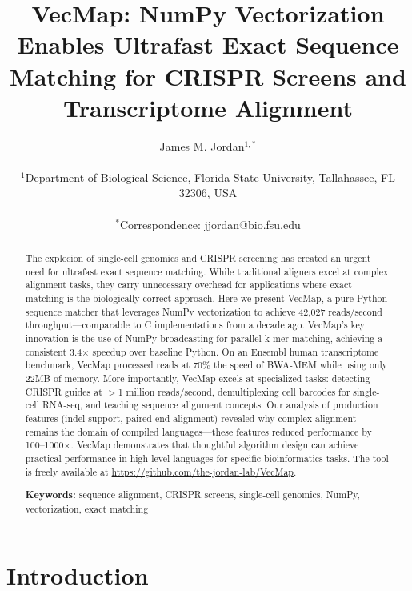 \documentclass[12pt]{article}
\begin{document}
\title{\textbf{VecMap: NumPy Vectorization Enables Ultrafast Exact Sequence Matching for CRISPR Screens and Transcriptome Alignment}}

\author{James M. Jordan$^{1,*}$ \\
\\
$^1$Department of Biological Science, Florida State University, Tallahassee, FL 32306, USA \\
\\
$^*$Correspondence: jjordan@bio.fsu.edu
}

\date{}

\maketitle

\begin{abstract}
The explosion of single-cell genomics and CRISPR screening has created an urgent need for ultrafast exact sequence matching. While traditional aligners excel at complex alignment tasks, they carry unnecessary overhead for applications where exact matching is the biologically correct approach. Here we present VecMap, a pure Python sequence matcher that leverages NumPy vectorization to achieve 42,027 reads/second throughput---comparable to C implementations from a decade ago. VecMap's key innovation is the use of NumPy broadcasting for parallel k-mer matching, achieving a consistent 3.4× speedup over baseline Python. On an Ensembl human transcriptome benchmark, VecMap processed reads at 70\% the speed of BWA-MEM while using only 22MB of memory. More importantly, VecMap excels at specialized tasks: detecting CRISPR guides at $>$1 million reads/second, demultiplexing cell barcodes for single-cell RNA-seq, and teaching sequence alignment concepts. Our analysis of production features (indel support, paired-end alignment) revealed why complex alignment remains the domain of compiled languages---these features reduced performance by 100--1000×. VecMap demonstrates that thoughtful algorithm design can achieve practical performance in high-level languages for specific bioinformatics tasks. The tool is freely available at \url{https://github.com/the-jordan-lab/VecMap}.

\textbf{Keywords:} sequence alignment, CRISPR screens, single-cell genomics, NumPy, vectorization, exact matching
\end{abstract}

\section{Introduction}
\end{document}
